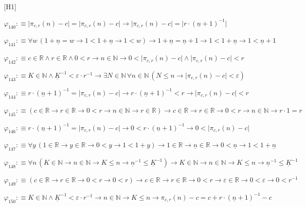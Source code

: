\begin{fullproof}{[H1]}
\begin{abbrevlist}
\item $\varphi_{140} :\equiv \lvert \pi_{c,r}(n) - c \rvert = \lvert \pi_{c,r}(n) - c \rvert \to \lvert \pi_{c,r}(n) - c \rvert = \lvert r \cdot (\underline{n} + 1)^{-1} \rvert$
\item $\varphi_{141} :\equiv \forall w\,(1 + \underline{n} = w \to 1 < 1 + \underline{n} \to 1 < w) \to 1 + \underline{n} = \underline{n} + 1 \to 1 < 1 + \underline{n} \to 1 < \underline{n} + 1$
\item $\varphi_{142} :\equiv c \in \mathbb{R} \land r \in \mathbb{R} \land 0 < r \to n \in \mathbb{N} \to 0 < \lvert \pi_{c,r}(n) - c \rvert \land \lvert \pi_{c,r}(n) - c \rvert < r$
\item $\varphi_{143} :\equiv K \in \mathbb{N} \land \underline{K}^{-1} < \varepsilon \cdot r^{-1} \to \exists N \in \mathbb{N}\,\forall n \in \mathbb{N}\,(N \leq n \to \lvert \pi_{c,r}(n) - c \rvert < \varepsilon)$
\item $\varphi_{144} :\equiv r \cdot (\underline{n} + 1)^{-1} = \lvert \pi_{c,r}(n) - c \rvert \to r \cdot (\underline{n} + 1)^{-1} < r \to \lvert \pi_{c,r}(n) - c \rvert < r$
\item $\varphi_{145} :\equiv (c \in \mathbb{R} \to r \in \mathbb{R} \to 0 < r \to n \in \mathbb{N} \to r \in \mathbb{R}) \to c \in \mathbb{R} \to r \in \mathbb{R} \to 0 < r \to n \in \mathbb{N} \to r \cdot 1 = r$
\item $\varphi_{146} :\equiv r \cdot (\underline{n} + 1)^{-1} = \lvert \pi_{c,r}(n) - c \rvert \to 0 < r \cdot (\underline{n} + 1)^{-1} \to 0 < \lvert \pi_{c,r}(n) - c \rvert$
\item $\varphi_{147} :\equiv \forall y\,(1 \in \mathbb{R} \to y \in \mathbb{R} \to 0 < y \to 1 < 1 + y) \to 1 \in \mathbb{R} \to \underline{n} \in \mathbb{R} \to 0 < \underline{n} \to 1 < 1 + \underline{n}$
\item $\varphi_{148} :\equiv \forall n\,(K \in \mathbb{N} \to n \in \mathbb{N} \to K \leq n \to \underline{n}^{-1} \leq \underline{K}^{-1}) \to K \in \mathbb{N} \to n \in \mathbb{N} \to K \leq n \to \underline{n}^{-1} \leq \underline{K}^{-1}$
\item $\varphi_{149} :\equiv (c \in \mathbb{R} \to r \in \mathbb{R} \to 0 < r \to 0 < r) \to c \in \mathbb{R} \to r \in \mathbb{R} \to 0 < r \to \varepsilon \in \mathbb{R} \to 0 < \varepsilon \to 0 < r^{-1}$
\item $\varphi_{150} :\equiv K \in \mathbb{N} \land \underline{K}^{-1} < \varepsilon \cdot r^{-1} \to n \in \mathbb{N} \to K \leq n \to \pi_{c,r}(n) - c = c + r \cdot (\underline{n} + 1)^{-1} - c$

\end{abbrevlist}
\end{fullproof}
